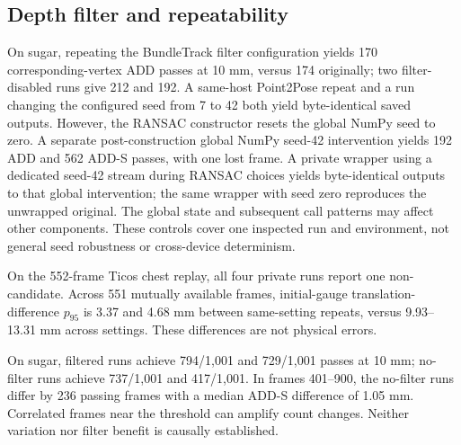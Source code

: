 \documentclass[10pt,journal]{IEEEtran}
\begin{document}
\subsection{Depth filter and repeatability}
On sugar, repeating the BundleTrack filter configuration yields 170 corresponding-vertex ADD passes at 10 mm, versus 174 originally; two filter-disabled runs give 212 and 192. A same-host Point2Pose repeat and a run changing the configured seed from 7 to 42 both yield byte-identical saved outputs. However, the RANSAC constructor resets the global NumPy seed to zero. A separate post-construction global NumPy seed-42 intervention yields 192 ADD and 562 ADD-S passes, with one lost frame. A private wrapper using a dedicated seed-42 stream during RANSAC choices yields byte-identical outputs to that global intervention; the same wrapper with seed zero reproduces the unwrapped original. The global state and subsequent call patterns may affect other components. These controls cover one inspected run and environment, not general seed robustness or cross-device determinism.

On the 552-frame Ticos chest replay, all four private runs report one non-candidate. Across 551 mutually available frames, initial-gauge translation-difference $p_{95}$ is 3.37 and 4.68 mm between same-setting repeats, versus 9.93--13.31 mm across settings. These differences are not physical errors.

On sugar, filtered runs achieve 794/1,001 and 729/1,001 passes at 10 mm; no-filter runs achieve 737/1,001 and 417/1,001. In frames 401--900, the no-filter runs differ by 236 passing frames with a median ADD-S difference of 1.05 mm. Correlated frames near the threshold can amplify count changes. Neither variation nor filter benefit is causally established.
\end{document}
